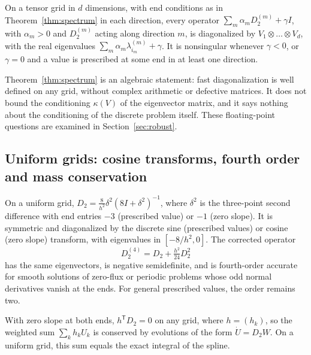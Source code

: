 \documentclass[smallextended,envcountsame]{svjour3}
\begin{document}
\begin{corollary}\label{cor:tensor}
On a tensor grid in $d$ dimensions, with end conditions as in Theorem~\ref{thm:spectrum} in each direction,
every operator $\sum_m\alpha_mD_2^{(m)}+\gamma I$, with $\alpha_m>0$ and $D_2^{(m)}$ acting along direction
$m$, is diagonalized by $V_1\otimes\dots\otimes V_d$, with the real eigenvalues
$\sum_m\alpha_m\lambda^{(m)}_{i_m}+\gamma$. It is nonsingular whenever $\gamma<0$, or $\gamma=0$ and a value
is prescribed at some end in at least one direction.
\end{corollary}

Theorem~\ref{thm:spectrum} is an algebraic statement: fast diagonalization is well defined on any grid,
without complex arithmetic or defective matrices. It does not bound the conditioning $\kappa(V)$ of the
eigenvector matrix, and it says nothing about the conditioning of the discrete problem itself. These
floating-point questions are examined in Section~\ref{sec:robust}.

\subsection{Uniform grids: cosine transforms, fourth order and mass conservation}
\begin{proposition}\label{thm:fourth}
On a uniform grid, $D_2=\frac{8}{h^2}\delta^2(8I+\delta^2)^{-1}$, where $\delta^2$ is the three-point second
difference with end entries $-3$ (prescribed value) or $-1$ (zero slope). It is symmetric and diagonalized
by the discrete sine (prescribed values) or cosine (zero slope) transform, with eigenvalues in
$[-8/h^2,0]$. The corrected operator
\begin{equation}\label{eq:D24}
D_2^{(4)}=D_2+\tfrac{h^2}{24}D_2^2
\end{equation}
has the same eigenvectors, is negative semidefinite, and is fourth-order accurate for smooth solutions
of zero-flux or periodic problems whose odd normal derivatives vanish at the ends. For general prescribed
values, the order remains two.
\end{proposition}

\begin{proposition}\label{prop:mass}
With zero slope at both ends, $h^{\mathsf T}D_2=0$ on any grid, where $h=(h_k)$, so the weighted sum
$\sum_kh_kU_k$ is conserved by evolutions of the form $\dot U=D_2W$. On a uniform grid, this sum equals the
exact integral of the spline.
\end{proposition}
\end{document}
